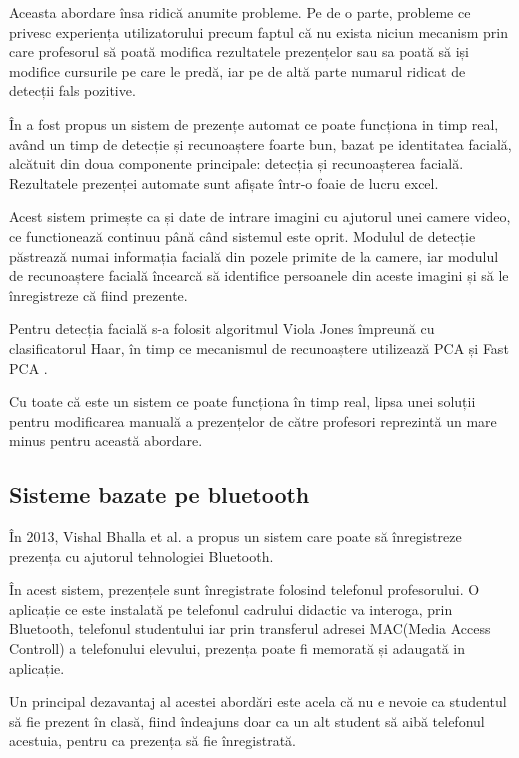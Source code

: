 \documentclass[a4paper, 12pt]{article}
\begin{document}
	Aceasta abordare însa ridică anumite probleme. Pe de o parte, probleme ce privesc experiența utilizatorului precum faptul că nu exista niciun mecanism prin care profesorul să poată modifica rezultatele prezențelor sau sa poată să iși modifice cursurile pe care le predă, iar pe de altă parte numarul ridicat de detecții fals pozitive.
	\bigskip
	
	În \textbf{\cite{kumar2011real}} a fost propus un sistem de prezențe automat ce poate funcționa in timp real, având un timp de detecție și recunoaștere foarte bun, bazat pe identitatea facială, alcătuit din doua componente principale: detecția și  recunoașterea facială. Rezultatele prezenței automate sunt afișate într-o foaie de lucru excel.
	
	Acest sistem primește ca și date de intrare imagini cu ajutorul unei camere video, ce functionează continuu până când sistemul este oprit. Modulul de detecție păstrează numai informația facială din pozele primite de la camere, iar modulul de recunoaștere facială încearcă să identifice persoanele din aceste imagini și să le înregistreze că fiind prezente.
	
	Pentru detecția facială s-a folosit algoritmul Viola Jones \textbf{\cite{viola2001rapid}} împreună cu clasificatorul Haar, în timp ce mecanismul de recunoaștere utilizează PCA și Fast PCA \textbf{\cite{mackiewicz1993principal}}.
	
	Cu toate că este un sistem ce poate funcționa în timp real, lipsa unei soluții pentru modificarea manuală a prezențelor de către profesori reprezintă un mare minus pentru această abordare.
	
	\subsection{Sisteme bazate pe bluetooth}
	\bigskip
	\quad\space În 2013, Vishal Bhalla et al. \textbf{\cite{bhalla2013bluetooth}} a propus un sistem care poate să înregistreze prezența cu ajutorul tehnologiei Bluetooth. 
	
	În acest sistem, prezențele sunt înregistrate folosind telefonul profesorului. O aplicație ce este instalată pe telefonul cadrului didactic va interoga, prin Bluetooth, telefonul studentului iar prin transferul adresei MAC(Media Access Controll) a telefonului elevului, prezența poate fi memorată și adaugată in aplicație.
	
	Un principal dezavantaj al acestei abordări este acela că nu e nevoie ca studentul să fie prezent în clasă, fiind îndeajuns doar ca un alt student să aibă telefonul acestuia, pentru ca prezența să fie înregistrată.
	
\end{document}
